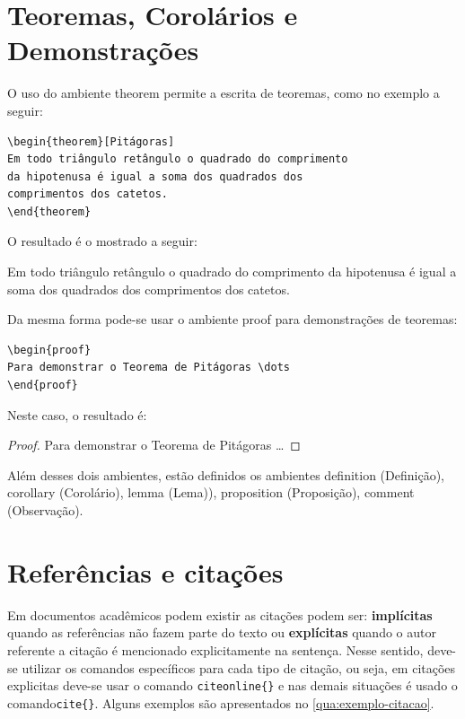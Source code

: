\section{Teoremas, Corolários e Demonstrações}
\label{sec:teor}
 O uso do ambiente \textsf{theorem} permite a escrita de teoremas, como no exemplo a seguir:
\begin{verbatim}
\begin{theorem}[Pitágoras]
Em todo triângulo retângulo o quadrado do comprimento
da hipotenusa é igual a soma dos quadrados dos
comprimentos dos catetos.
\end{theorem}
\end{verbatim}

O resultado é o mostrado a seguir:

\begin{theorem}[Pitágoras]
Em todo triângulo retângulo o quadrado do comprimento da hipotenusa é igual a soma dos quadrados dos comprimentos dos catetos.
\end{theorem}

Da mesma forma pode-se usar o ambiente \textsf{proof} para demonstrações de teoremas:
\begin{verbatim}
\begin{proof}
Para demonstrar o Teorema de Pitágoras \dots
\end{proof}
\end{verbatim}

Neste caso, o resultado é:
\begin{proof}
Para demonstrar o Teorema de Pitágoras \dots
\end{proof}

Além desses dois ambientes, estão definidos os ambientes \textsf{definition} (Definição), \textsf{corollary} (Corolário), \textsf{lemma} (Lema)), \textsf{proposition} (Proposição), \textsf{comment} (Observação).

\section{Referências e citações}

Em documentos acadêmicos podem existir as citações podem ser: \textbf{implícitas} quando as referências não fazem parte do texto ou \textbf{explícitas} quando o autor referente a citação é mencionado explicitamente na sentença. Nesse sentido, deve-se utilizar os comandos específicos para cada tipo de citação, ou seja, em citações explicitas deve-se usar o comando \verb|citeonline{}| e nas demais situações é usado o comando\verb|cite{}|. Alguns exemplos são apresentados no \autoref{qua:exemplo-citacao}.

